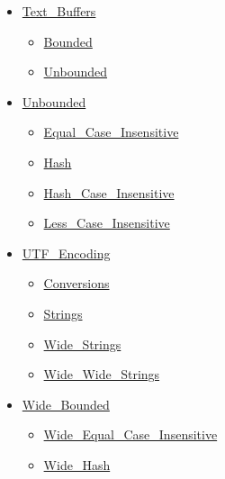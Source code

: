 \documentclass[english]{article}
\begin{document}
\begin{scriptsize}
\begin{multicols*}{5}
\begin{itemize}[leftmargin=0mm]
\begin{itemize}[leftmargin=5mm]
\begin{itemize}[leftmargin=5mm]
\begin{itemize}[leftmargin=5mm]
	  \end{itemize}
	\item[] \href{http://www.ada-auth.org/standards/22rm/html/RM-A-4-12.html}{Text\_Buffers}
	  \begin{itemize}[leftmargin=5mm]
	  \item[] \href{http://www.ada-auth.org/standards/22rm/html/RM-A-4-12.html}{Bounded}
	  \item[] \href{http://www.ada-auth.org/standards/22rm/html/RM-A-4-12.html}{Unbounded}
	  \end{itemize}
	\item[] \href{http://www.ada-auth.org/standards/22rm/html/RM-A-4-5.html}{Unbounded}
	  \begin{itemize}[leftmargin=5mm]
	  \item[] \href{http://www.ada-auth.org/standards/22rm/html/RM-A-4-10.html}{Equal\_Case\_Insensitive}
	  \item[] \href{http://www.ada-auth.org/standards/22rm/html/RM-A-4-9.html}{Hash}
	  \item[] \href{http://www.ada-auth.org/standards/22rm/html/RM-A-4-9.html}{Hash\_Case\_Insensitive}
	  \item[] \href{http://www.ada-auth.org/standards/22rm/html/RM-A-4-10.html}{Less\_Case\_Insensitive}
	  \end{itemize}
	\item[] \href{http://www.ada-auth.org/standards/22rm/html/RM-A-4-11.html}{UTF\_Encoding}
	  \begin{itemize}[leftmargin=5mm]
	  \item[] \href{http://www.ada-auth.org/standards/22rm/html/RM-A-4-11.html}{Conversions}
	  \item[] \href{http://www.ada-auth.org/standards/22rm/html/RM-A-4-11.html}{Strings}
	  \item[] \href{http://www.ada-auth.org/standards/22rm/html/RM-A-4-11.html}{Wide\_Strings}
	  \item[] \href{http://www.ada-auth.org/standards/22rm/html/RM-A-4-11.html}{Wide\_Wide\_Strings}
	  \end{itemize}
	\item[] \href{http://www.ada-auth.org/standards/22rm/html/RM-A-4-7.html}{Wide\_Bounded}
	  \begin{itemize}[leftmargin=5mm]
	  \item[] \href{http://www.ada-auth.org/standards/22rm/html/RM-A-4-7.html}{Wide\_Equal\_Case\_Insensitive}
	  \item[] \href{http://www.ada-auth.org/standards/22rm/html/RM-A-4-7.html}{Wide\_Hash}

\end{itemize}
\end{itemize}
\end{itemize}
\end{itemize}
\end{multicols*}
\end{scriptsize}
\end{document}
